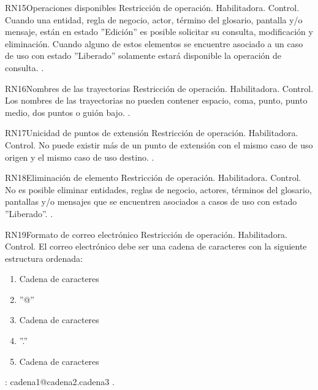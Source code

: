 \begin{BussinesRule}{RN15}{Operaciones disponibles} 
	\BRitem[Tipo:] Restricción de operación. 
	\BRitem[Clase:] Habilitadora. 
	\BRitem[Nivel:] Control. %
	\BRitem[Descripción:] Cuando una entidad, regla de negocio, actor, término del glosario, pantalla y/o mensaje, están en estado ''Edición'' es posible solicitar su consulta, modificación y eliminación. Cuando alguno de estos elementos se encuentre asociado a un caso de uso con estado ''Liberado'' solamente estará disponible la operación de consulta.
	 \UCref{}{}. 
\end{BussinesRule}

\begin{BussinesRule}{RN16}{Nombres de las trayectorias} 
	\BRitem[Tipo:] Restricción de operación. 
	\BRitem[Clase:] Habilitadora. 
	\BRitem[Nivel:] Control. %
	\BRitem[Descripción:] Los nombres de las trayectorias no pueden contener espacio, coma, punto, punto medio, dos puntos o guión bajo.
	 \UCref{}{}. 
\end{BussinesRule}


\begin{BussinesRule}{RN17}{Unicidad de puntos de extensión} 
	\BRitem[Tipo:] Restricción de operación. 
	\BRitem[Clase:] Habilitadora. 
	\BRitem[Nivel:] Control. %
	\BRitem[Descripción:] No puede existir más de un punto de extensión con el mismo caso de uso origen y el mismo caso de uso destino.
	 \UCref{}{}. 
\end{BussinesRule}


\begin{BussinesRule}{RN18}{Eliminación de elemento} 
	\BRitem[Tipo:] Restricción de operación. 
	\BRitem[Clase:] Habilitadora. 
	\BRitem[Nivel:] Control. %
	\BRitem[Descripción:] No es posible eliminar entidades, reglas de negocio, actores, términos del glosario, pantallas y/o mensajes que se encuentren asociados a casos de uso con estado ''Liberado''.
	 \UCref{}{}. 
\end{BussinesRule}

\begin{BussinesRule}{RN19}{Formato de correo electrónico} 
	\BRitem[Tipo:] Restricción de operación. 
	\BRitem[Clase:] Habilitadora. 
	\BRitem[Nivel:] Control. %
	\BRitem[Descripción:] El correo electrónico debe ser una cadena de caracteres con la siguiente estructura ordenada:
	\begin{enumerate}
		\item Cadena de caracteres
		\item ''@''
		\item Cadena de caracteres
		\item ''.''
		\item Cadena de caracteres
	\end{enumerate}
	\BRitem[Ejemplo]: cadena1@cadena2.cadena3
	 \UCref{}{}. 
\end{BussinesRule}

